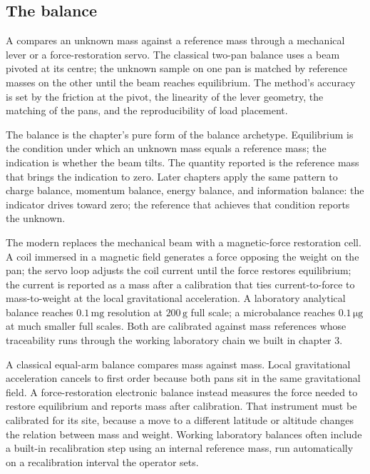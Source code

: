 \subsection{The balance}

A  compares an unknown mass against a reference
mass through a mechanical lever or a force-restoration servo. The
classical two-pan balance uses a beam pivoted at its centre; the
unknown sample on one pan is matched by reference masses on the
other until the beam reaches equilibrium. The method's accuracy is
set by the friction at the pivot, the linearity of the lever
geometry, the matching of the pans, and the reproducibility of
load placement.

\begin{archetype}
The balance is the chapter's pure form of the balance archetype.
Equilibrium is the condition under which an unknown mass equals a
reference mass; the indication is whether the beam tilts. The
quantity reported is the reference mass that brings the indication
to zero. Later chapters apply the same pattern to charge balance,
momentum balance, energy balance, and information balance: the
indicator drives toward zero; the reference that achieves that
condition reports the unknown.
\end{archetype}

The modern  replaces the mechanical
beam with a magnetic-force restoration cell. A coil immersed in a
magnetic field generates a force opposing the weight on the pan; the
servo loop adjusts the coil current until the force restores
equilibrium; the current is reported as a mass after a calibration
that ties current-to-force to mass-to-weight at the local
gravitational acceleration. A laboratory analytical balance reaches
$0.1 \,\si{\milli\gram}$ resolution at $200 \,\si{\gram}$ full scale;
a microbalance reaches $0.1 \,\si{\micro\gram}$ at much smaller full
scales. Both are calibrated against mass references whose
traceability runs through the working laboratory chain we built in
chapter 3.

A classical equal-arm balance compares mass against mass. Local
gravitational acceleration cancels to first order because both pans
sit in the same gravitational field. A force-restoration electronic
balance instead measures the force needed to restore equilibrium
and reports mass after calibration. That instrument must be
calibrated for its site, because a move to a different latitude or
altitude changes the relation between mass and weight. Working
laboratory balances often include a built-in recalibration step
using an internal reference mass, run automatically on a
recalibration interval the operator sets.

